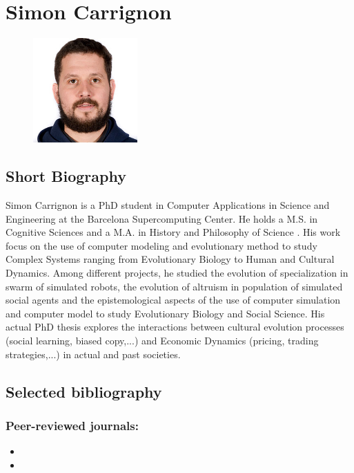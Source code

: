 \documentclass[12pt,a4paper]{article}
\begin{document}
\section*{Simon Carrignon}

\begin{figure}[h]
	\hfill \includegraphics[width=4cm]{scarrign.png}
\end{figure}

\subsection*{Short Biography}
Simon Carrignon is a PhD student in Computer Applications in Science and Engineering at the Barcelona Supercomputing Center. He holds a M.S. in Cognitive Sciences and a M.A. in History and Philosophy of Science . His work focus on the use of computer modeling and evolutionary method to study Complex Systems ranging from Evolutionary Biology to Human and Cultural Dynamics. Among different projects, he studied the evolution of specialization in swarm of simulated robots, the evolution of altruism in population of simulated social agents and the epistemological aspects of the use of computer simulation and computer model to study Evolutionary Biology and Social Science. His actual PhD thesis explores the interactions between cultural evolution processes (social learning, biased copy,...) and Economic Dynamics (pricing, trading strategies,...) in actual and past societies.


\subsection*{Selected bibliography}

\subsubsection*{Peer-reviewed journals:}

\begin{itemize}
    \item  {}

    \item  {}
\end{itemize}
\end{document}
